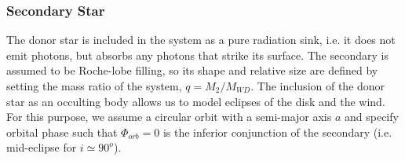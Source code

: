 \documentclass[preprint, a4paper, 11pt]{aastex}
\begin{document}
\subsubsection{Secondary Star}

The donor star is included in the system as a pure radiation sink, 
i.e. it does not emit photons, but absorbs any photons that strike its
surface. The secondary is assumed to be Roche-lobe filling, so its
shape and relative size are defined by setting the mass ratio of the system, 
$q = M_2/M_{WD}$. The inclusion of the donor star as an occulting body
allows us to model eclipses of the disk and the wind. For this
purpose, we assume a circular orbit with a semi-major axis $a$ and 
specify orbital phase such that $\Phi_{orb} = 0$ is the
inferior conjunction of the secondary (i.e. mid-eclipse for $i \simeq
90^o$).




%
%
\end{document}

